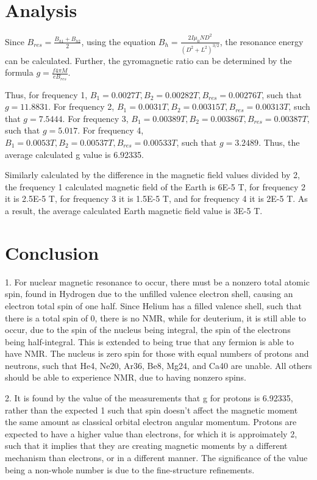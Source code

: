 \documentclass[11pt]{article}
\begin{document}
\section{Analysis}

Since $B_{res} = \frac{B_{h1} + B_{h2}}{2}$, using the equation $B_h = \frac{2I\mu_0ND^2}{(D^2 + L^2)^{3/2}}$, the resonance energy can be calculated. Further, the gyromagnetic ratio can be determined by the formula $g = \frac{f4\pi M}{eB_{res}}$.

Thus, for frequency 1, $B_1 = 0.0027 T, B_2 = 0.00282 T, B_{res} = 0.00276 T$, such that $g = 11.8831$. For frequency 2, $B_1 = 0.0031 T, B_2 = 0.00315 T, B_{res} = 0.00313 T$, such that $g = 7.5444$. For frequency 3, $B_1 = 0.00389 T, B_2 = 0.00386 T, B_{res} = 0.00387 T$, such that $g = 5.017$. For frequency 4, $B_1 = 0.0053 T, B_2 = 0.00537 T, B_{res} = 0.00533 T$, such that $g = 3.2489$. Thus, the average calculated g value is 6.92335.

Similarly calculated by the difference in the magnetic field values divided by 2, the frequency 1 calculated magnetic field of the Earth is 6E-5 T, for frequency 2 it is 2.5E-5 T, for frequency 3 it is 1.5E-5 T, and for frequency 4 it is 2E-5 T. As a result, the average calculated Earth magnetic field value is 3E-5 T.

\section{Conclusion}

1. For nuclear magnetic resonance to occur, there must be a nonzero total atomic spin, found in Hydrogen due to the unfilled valence electron shell, causing an electron total spin of one half. Since Helium has a filled valence shell, such that there is a total spin of 0, there is no NMR, while for deuterium, it is still able to occur, due to the spin of the nucleus being integral, the spin of the electrons being half-integral. This is extended to being true that any fermion is able to have NMR. The nucleus is zero spin for those with equal numbers of protons and neutrons, such that He4, Ne20, Ar36, Be8, Mg24, and Ca40 are unable. All others should be able to experience NMR, due to having nonzero spins.

2. It is found by the value of the measurements that g for protons is 6.92335, rather than the expected 1 such that spin doesn’t affect the magnetic moment the same amount as classical orbital electron angular momentum. Protons are expected to have a higher value than electrons, for which it is approimately 2, such that it implies that they are creating magnetic moments by a different mechanism than electrons, or in a different manner. The significance of the value being a non-whole number is due to the fine-structure refinements.
\end{document}
